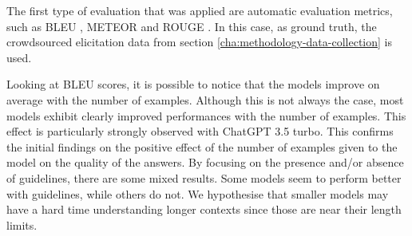 % 
The first type of evaluation that was applied are automatic evaluation metrics, such as BLEU \cite{bleu}, METEOR \cite{meteor} and ROUGE \cite{rouge}. In this case, as ground truth, the crowdsourced elicitation data from section \ref{cha:methodology-data-collection} is used.


% 
% 

Looking at BLEU scores, it is possible to notice that the models improve on average with the number of examples. Although this is not always the case, most models exhibit clearly improved performances with the number of examples. This effect is particularly strongly observed with ChatGPT 3.5 turbo. This confirms the initial findings on the positive effect of the number of examples given to the model on the quality of the answers.
By focusing on the presence and/or absence of guidelines, there are some mixed results. Some models seem to perform better with guidelines, while others do not. We hypothesise that smaller models may have a hard time understanding longer contexts since those are near their length limits. 

